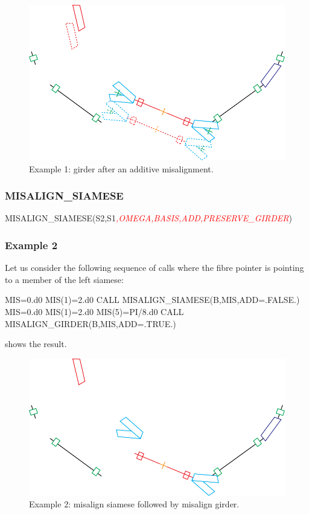 \begin{figure}[ht]
  \centering
  \includegraphics[width=.9\textwidth]{illustrations/misalign-fig3}
  \caption{Example 1: girder after an additive misalignment.}
  \label{fig:Example-1-2}
\end{figure}


\subsubsection{MISALIGN_SIAMESE}

%
\begin{ptccode}
MISALIGN_SIAMESE(S2,S1\textit{\textcolor{red}{,OMEGA,BASIS,ADD,PRESERVE_GIRDER}})
\end{ptccode}


\subsubsection*{Example 2}

Let us consider the following sequence of calls where the fibre pointer
 is pointing to a member of the left siamese:

\begin{ptccode}
MIS=0.d0
MIS(1)=2.d0
CALL MISALIGN_SIAMESE(B,MIS,ADD=.FALSE.)
MIS=0.d0
MIS(1)=2.d0
MIS(5)=PI/8.d0
CALL MISALIGN_GIRDER(B,MIS,ADD=.TRUE.)
\end{ptccode}

 shows the result.

\begin{figure}[ht]\forceversofloat
  \centering
  \includegraphics[width=.9\textwidth]{illustrations/misalign-fig4}
  \caption{Example 2: misalign siamese followed by misalign girder.}
  \label{fig:Example-2}
\end{figure}


